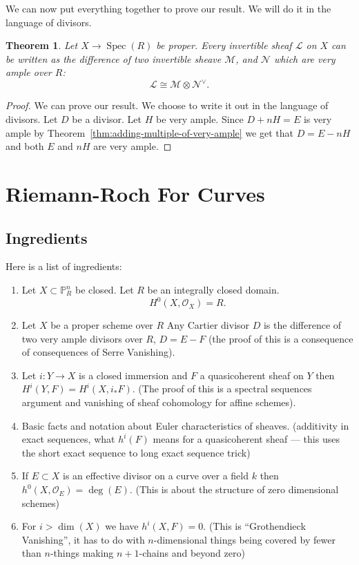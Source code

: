 \documentclass[12pt]{article}
\numberwithin{equation}{section}
\newtheorem{theorem}{Theorem}[subsection]
\theoremstyle{definition}
\theoremstyle{remark}
\newcommand{\Ocal}{\mathcal{O}}
\newcommand{\PP}{\mathbb{P}}
\newcommand{\Spec}{\operatorname{Spec}}
\newcommand{\Lcal}{\mathcal{L}}
\begin{document}
We can now put everything together to prove our result. We will do it in the language of divisors. 
\begin{theorem}
	Let $X \to \Spec(R)$ be proper. 
	Every invertible sheaf $\Lcal$ on $X$ can be written as the difference of two invertible sheave $\mathcal{M}$, and $\mathcal{N}$ which are very ample over $R$:
	$$ \Lcal \cong \mathcal{M} \otimes \mathcal{N}^{\vee}.$$
\end{theorem}
\begin{proof}
	We can prove our result.
	We choose to write it out in the language of divisors.
	Let $D$ be a divisor. 
	Let $H$ be very ample. Since $D+nH=E$ is very ample by Theorem~\ref{thm:adding-multiple-of-very-ample} we get that $D = E-nH$ and both $E$ and $nH$ are very ample.
\end{proof}


\section{Riemann-Roch For Curves}
\subsection{Ingredients}
Here is a list of ingredients:
\begin{enumerate}
	\item Let $X \subset \PP^n_R$ be closed. Let $R$ be an integrally closed domain. 
	 $$ H^0(X,\Ocal_X)= R.$$
	 \item Let $X$ be a proper scheme over $R$
	 Any Cartier divisor $D$ is the difference of two very ample divisors over $R$, $D=E-F$ (the proof of this is a consequence of consequences of Serre Vanishing).
	 \item Let $i:Y\to X$ is a closed immersion and $F$ a quasicoherent sheaf on $Y$ then $H^i(Y,F) = H^i(X,i_*F)$. (The proof of this is a spectral sequences argument and vanishing of sheaf cohomology for affine schemes).
	 \item Basic facts and notation about Euler characteristics of sheaves. (additivity in exact sequences, what $h^i(F)$ means for a quasicoherent sheaf --- this uses the short exact sequence to long exact sequence trick)
	 \item If $E \subset X$ is an effective divisor on a curve over a field $k$ then $h^0(X,\Ocal_E)=\deg(E)$. (This is about the structure of zero dimensional schemes)
	 \item For $i>\dim(X)$ we have $h^i(X,F)=0$. (This is ``Grothendieck Vanishing'', it has to do with $n$-dimensional things being covered by fewer than $n$-things making $n+1$-chains and beyond zero)
\end{enumerate}
\end{document}
